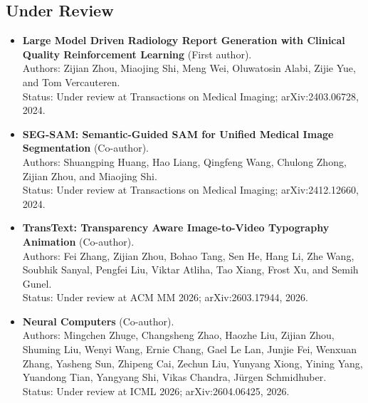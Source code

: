 \subsection{Under Review}
\begin{itemize}
    \item \textbf{Large Model Driven Radiology Report Generation with Clinical Quality Reinforcement Learning} (First author).\\
    Authors: Zijian Zhou, Miaojing Shi, Meng Wei, Oluwatosin Alabi, Zijie Yue, and Tom Vercauteren.\\
    Status: Under review at Transactions on Medical Imaging; arXiv:2403.06728, 2024.~\citep{zhou2024large}
    \item \textbf{SEG-SAM: Semantic-Guided SAM for Unified Medical Image Segmentation} (Co-author).\\
    Authors: Shuangping Huang, Hao Liang, Qingfeng Wang, Chulong Zhong, Zijian Zhou, and Miaojing Shi.\\
    Status: Under review at Transactions on Medical Imaging; arXiv:2412.12660, 2024.~\citep{huang2024seg}
    \item \textbf{TransText: Transparency Aware Image-to-Video Typography Animation} (Co-author).\\
    Authors: Fei Zhang, Zijian Zhou, Bohao Tang, Sen He, Hang Li, Zhe Wang, Soubhik Sanyal, Pengfei Liu, Viktar Atliha, Tao Xiang, Frost Xu, and Semih Gunel.\\
    Status: Under review at ACM MM 2026; arXiv:2603.17944, 2026.~\citep{zhang2026transtext}
    \item \textbf{Neural Computers} (Co-author).\\
    Authors: Mingchen Zhuge, Changsheng Zhao, Haozhe Liu, Zijian Zhou, Shuming Liu, Wenyi Wang, Ernie Chang, Gael Le Lan, Junjie Fei, Wenxuan Zhang, Yasheng Sun, Zhipeng Cai, Zechun Liu, Yunyang Xiong, Yining Yang, Yuandong Tian, Yangyang Shi, Vikas Chandra, Jürgen Schmidhuber.\\
    Status: Under review at ICML 2026; arXiv:2604.06425, 2026.~\citep{zhuge2026neural}
\end{itemize}
